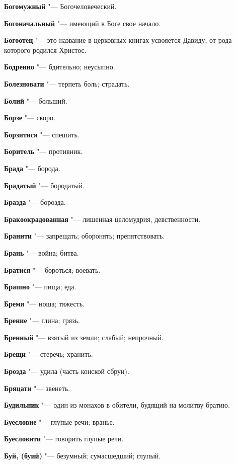 \begin{mymulticols}
\noindent\textbf{Богомужный} "--- Богочеловеческий. 

\noindent\textbf{Богоначальный} "--- имеющий в Боге свое начало. 

\noindent\textbf{Богоотец} "--- это название в церковных книгах усвояется Давиду, от рода которого родился Христос. 

\noindent\textbf{Бодренно} "--- бдительно; неусыпно. 

\noindent\textbf{Болезновати} "--- терпеть боль; страдать. 

\noindent\textbf{Болий} "--- больший. 

\noindent\textbf{Борзе} "--- скоро. 

\noindent\textbf{Борзитися} "--- спешить. 

\noindent\textbf{Боритель} "--- противник. 

\noindent\textbf{Брада} "--- борода. 

\noindent\textbf{Брадатый} "--- бородатый. 

\noindent\textbf{Бразда} "--- борозда. 

\noindent\textbf{Бракоокрадованная} "--- лишенная целомудрия, девственности. 

\noindent\textbf{Бранити} "--- запрещать; оборонять; препятствовать. 

\noindent\textbf{Брань} "--- война; битва. 

\noindent\textbf{Братися} "--- бороться; воевать. 

\noindent\textbf{Брашно} "--- пища; еда. 

\noindent\textbf{Бремя} "--- ноша; тяжесть. 

\noindent\textbf{Брение} "--- глина; грязь. 

\noindent\textbf{Бренный} "--- взятый из земли; слабый; непрочный. 

\noindent\textbf{Брещи} "--- стеречь; хранить. 

\noindent\textbf{Брозда} "--- удила (часть конской сбруи). 

\noindent\textbf{Бряцати} "--- звенеть. 

\noindent\textbf{Будильник} "--- один из монахов в обители, будящий на молитву братию. 

\noindent\textbf{Буесловие} "--- глупые речи; вранье. 

\noindent\textbf{Буесловити} "--- говорить глупые речи. 

\noindent\textbf{Буй, (буий)} "--- безумный; сумасшедший; глупый. 


\end{mymulticols}
